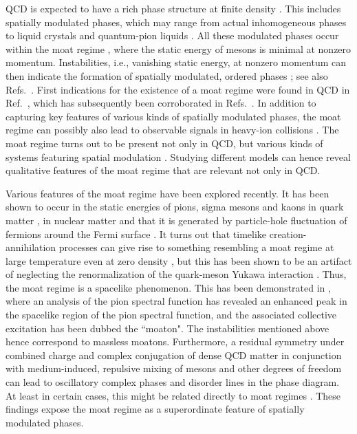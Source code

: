 \documentclass[reprint,english,superscriptaddress,preprintnumbers,amsmath,amssymb,aps,prd]{revtex4-2}
\begin{document}
QCD is expected to have a rich phase structure at finite density \cite{Fukushima:2010bq}. This includes spatially modulated phases, which may range from actual inhomogeneous phases \cite{Buballa:2014tba} to liquid crystals \cite{Lee:2015bva, Hidaka:2015xza} and quantum-pion liquids \cite{Pisarski:2020dnx}. All these modulated phases occur within the moat regime \cite{Pisarski:2021qof}, where the static energy of mesons is minimal at nonzero momentum. Instabilities, i.e., vanishing static energy, at nonzero momentum can then indicate the formation of spatially modulated, ordered phases \cite{Pawlowski:2025jpg}; see also Refs.\ \cite{Motta:2023pks,Motta:2024agi,Motta:2024rvk}. First indications for the existence of a moat regime were found in QCD in Ref.\ \cite{Fu:2019hdw}, which has subsequently been corroborated in Refs.\ \cite{Fu:2024rto, Pawlowski:2025jpg, Fu:2026qnl}. In addition to capturing key features of various kinds of spatially modulated phases, the moat regime can possibly also lead to observable signals in heavy-ion collisions \cite{Pisarski:2021qof, Rennecke:2023xhc, Nussinov:2024erh}. The moat regime turns out to be present not only in QCD, but various kinds of systems featuring spatial modulation \cite{Nussinov:2024erh}. Studying different models can hence reveal qualitative features of the moat regime that are relevant not only in QCD. 

Various features of the moat regime have been explored recently. It has been shown to occur in the static energies of pions, sigma mesons and kaons in quark matter \cite{Fu:2019hdw, Topfel:2024iop, Fu:2024rto, Cao:2025zvh, daSilva:2026plc}, in nuclear matter \cite{Motta:2025xop} and that it is generated by particle-hole fluctuation of fermions around the Fermi surface \cite{Fu:2024rto}. It turns out that timelike creation-annihilation processes can give rise to something resembling a moat regime at large temperature even at zero density \cite{Topfel:2024iop, Rennecke:2025kub}, but this has been shown to be an artifact of neglecting the renormalization of the quark-meson Yukawa interaction \cite{Rennecke:2025kub}. Thus, the moat regime is a spacelike phenomenon. This has been demonstrated in  \cite{Fu:2024rto}, where an analysis of the pion spectral function has revealed an enhanced peak in the spacelike region of the pion spectral function, and the associated collective excitation has been dubbed the ``moaton". The instabilities mentioned above hence correspond to massless moatons. Furthermore, a residual symmetry under combined charge and complex conjugation of dense QCD matter in conjunction with medium-induced, repulsive mixing of mesons and other degrees of freedom can lead to oscillatory complex phases and disorder lines in the phase diagram. At least in certain cases, this might be related directly to moat regimes \cite{Schindler:2019ugo, Schindler:2021otf, Haensch:2023sig}. These findings expose the moat regime as a superordinate feature of spatially modulated phases.
\end{document}
